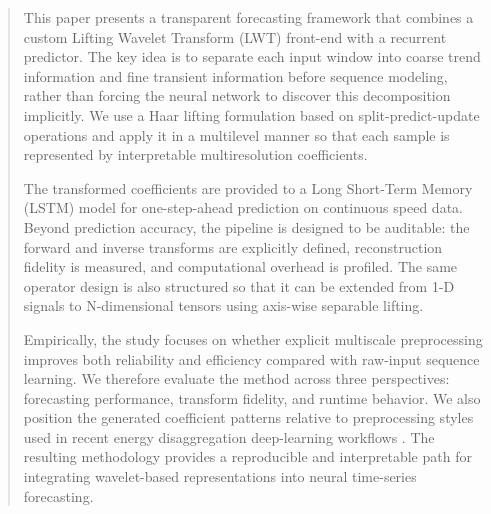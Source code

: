 \documentclass[journal]{IEEEtran}
\begin{document}







\maketitle

\begin{abstract}
This paper presents a transparent forecasting framework that combines a custom Lifting Wavelet Transform (LWT) front-end with a recurrent predictor. The key idea is to separate each input window into coarse trend information and fine transient information before sequence modeling, rather than forcing the neural network to discover this decomposition implicitly. We use a Haar lifting formulation based on split-predict-update operations and apply it in a multilevel manner so that each sample is represented by interpretable multiresolution coefficients.

The transformed coefficients are provided to a Long Short-Term Memory (LSTM) model for one-step-ahead prediction on continuous speed data. Beyond prediction accuracy, the pipeline is designed to be auditable: the forward and inverse transforms are explicitly defined, reconstruction fidelity is measured, and computational overhead is profiled. The same operator design is also structured so that it can be extended from 1-D signals to N-dimensional tensors using axis-wise separable lifting.

Empirically, the study focuses on whether explicit multiscale preprocessing improves both reliability and efficiency compared with raw-input sequence learning. We therefore evaluate the method across three perspectives: forecasting performance, transform fidelity, and runtime behavior. We also position the generated coefficient patterns relative to preprocessing styles used in recent energy disaggregation deep-learning workflows \cite{ylla2024nilm,yllaRepo}. The resulting methodology provides a reproducible and interpretable path for integrating wavelet-based representations into neural time-series forecasting.
\end{abstract}
\end{document}
